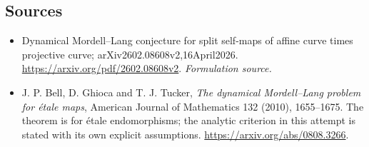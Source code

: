 \documentclass[11pt]{article}
\begin{document}
\subsection{Sources}
\begin{itemize}
\item[S1]Dynamical Mordell–Lang conjecture for split self-maps of affine curve times projective curve; arXiv2602.08608v2,16April2026.
\url{https://arxiv.org/pdf/2602.08608v2}.
\textit{Formulation source.}
\item[E1]J. P. Bell, D. Ghioca and T. J. Tucker, \textit{The dynamical Mordell--Lang problem for \'etale maps}, American Journal of Mathematics 132 (2010), 1655--1675. The theorem is for \'etale endomorphisms; the analytic criterion in this attempt is stated with its own explicit assumptions.
\url{https://arxiv.org/abs/0808.3266}.

\end{itemize}
\end{document}
